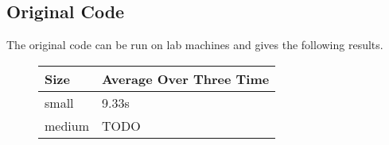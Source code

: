 \subsection*{Original Code}
The original code can be run on lab machines and gives the following results.\\
\begin{figure}[H]\centering \begin{tabular}{ l | l }
  \hline
  Size & Average Over Three Time \\
  \hline
  \hline
  small & 9.33s \\
  medium & TODO \\
  \hline
\end{tabular} \end{figure}
